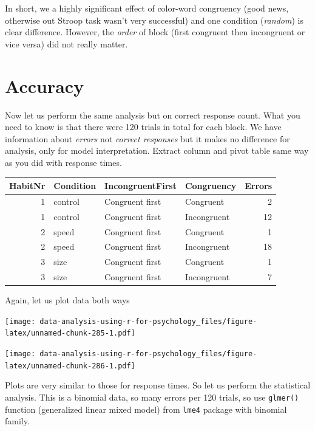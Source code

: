 \documentclass[
]{book}
\begin{document}
In short, we a highly significant effect of color-word congruency (good news, otherwise out Stroop task wasn't very successful) and one condition (\emph{random}) is clear difference. However, the \emph{order} of block (first congruent then incongruent or vice versa) did not really matter.

\hypertarget{accuracy-1}{%
\section{Accuracy}\label{accuracy-1}}

Now let us perform the same analysis but on correct response count. What you need to know is that there were 120 trials in total for each block. We have information about \emph{errors} not \emph{correct responses} but it makes no difference for analysis, only for model interpretation. Extract column and pivot table same way as you did with response times.

\begin{tabular}{r|l|l|l|r}
\hline
HabitNr & Condition & IncongruentFirst & Congruency & Errors\\
\hline
1 & control & Congruent first & Congruent & 2\\
\hline
1 & control & Congruent first & Incongruent & 12\\
\hline
2 & speed & Congruent first & Congruent & 1\\
\hline
2 & speed & Congruent first & Incongruent & 18\\
\hline
3 & size & Congruent first & Congruent & 1\\
\hline
3 & size & Congruent first & Incongruent & 7\\
\hline
\end{tabular}

Again, let us plot data both ways

\texttt{[image: data-analysis-using-r-for-psychology\_files/figure-latex/unnamed-chunk-285-1.pdf]}

\texttt{[image: data-analysis-using-r-for-psychology\_files/figure-latex/unnamed-chunk-286-1.pdf]}

Plots are very similar to those for response times. So let us perform the statistical analysis. This is a binomial data, so many errors per 120 trials, so use \texttt{glmer()} function (generalized linear mixed model) from \texttt{lme4} package with binomial family.
\end{document}
